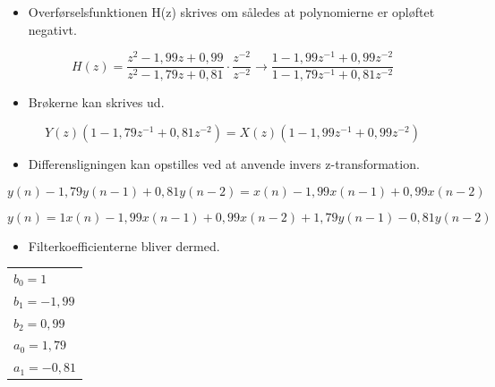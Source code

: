 \documentclass[danish]{article}
\begin{document}
\begin{itemize}
	\item Overførselsfunktionen H(z) skrives om således at polynomierne er opløftet negativt.
\end{itemize}

\begin{equation}
H(z) = \frac{z^2 - 1,99z + 0,99}{z^2 - 1,79z + 0,81} \cdot \frac{z^{-2}}{z^{-2}} \longrightarrow \frac{1 - 1,99z^{-1} + 0,99z^{-2}}{1 - 1,79z^{-1} + 0,81z^{-2}}
\end{equation}

\begin{itemize}
	\item Brøkerne kan skrives ud.
\end{itemize}

\begin{equation}
Y(z)(1-1,79z^{-1}+0,81z^{-2}) = X(z)(1-1,99z^{-1}+0,99 z^{-2})
\end{equation}

\begin{itemize}
	\item Differensligningen kan opstilles ved at anvende invers z-transformation.
\end{itemize}

\begin{equation}
y(n)-1,79y(n-1)+0,81y(n-2)=x(n)-1,99x(n-1)+0,99x(n-2)
\end{equation}

\begin{equation}
y(n)=1x(n)-1,99x(n-1)+0,99x(n-2)+1,79y(n-1)-0,81y(n-2)
\end{equation}

\begin{itemize}
	\item Filterkoefficienterne bliver dermed.
\end{itemize}

{\setlength\parindent{24pt}
\begin{tabular}{l}
	$b_0 = 1$ \\ 
	
	$b_1 = -1,99$ \\ 
	
	$b_2 = 0,99$ \\ 
	
	$a_0 = 1,79$ \\ 
	
	$a_1 = -0,81$ \\
\end{tabular}}
\end{document}

